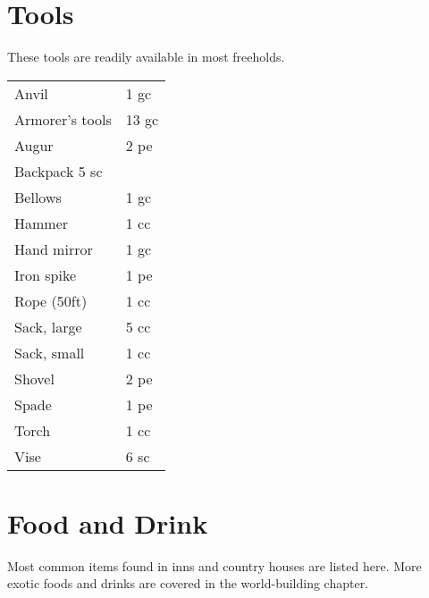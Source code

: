 \section{Tools}

These tools are readily available in most freeholds.

\begin{center}
{
\begin{xtabular}{|l|l|}
Anvil & 1 gc \\
Armorer's tools & 13 gc \\
Augur & 2 pe \\
Backpack 5 sc \\
Bellows & 1 gc \\
Hammer & 1 cc \\
Hand mirror & 1 gc \\
Iron spike & 1 pe \\
Rope (50ft) & 1 cc \\
Sack, large & 5 cc \\
Sack, small & 1 cc \\
Shovel & 2 pe \\
Spade & 1 pe \\
Torch & 1 cc \\
Vise & 6 sc \\
\hline
\end{xtabular}
}
\end{center}

\section{Food and Drink}

Most common items found in inns and country houses are
listed here. More exotic foods and drinks are covered
in the world-building chapter.

